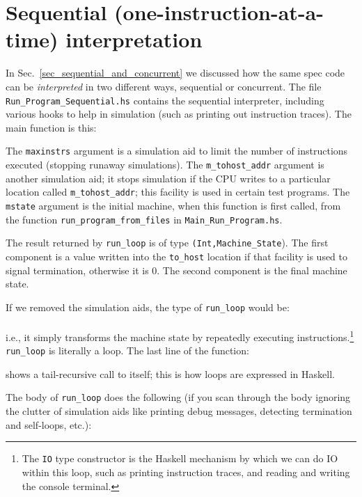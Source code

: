 \documentclass[11pt]{article}
\newcommand{\hmmm}{\hspace*{3em}}
\begin{document}

\section{Sequential (one-instruction-at-a-time)  interpretation}

In Sec.~\ref{sec_sequential_and_concurrent} we discussed how the same
spec code can be \emph{interpreted} in two different ways, sequential
or concurrent.  The file \verb|Run_Program_Sequential.hs| contains the
sequential interpreter, including various hooks to help in simulation
(such as printing out instruction traces).  The main function is this:



The \verb|maxinstrs| argument is a simulation aid to limit the number
of instructions executed (stopping runaway simulations).  The
\verb|m_tohost_addr| argument is another simulation aid; it stops
simulation if the CPU writes to a particular location called
\verb|m_tohost_addr|; this facility is used in certain test programs.
The \verb|mstate| argument is the initial machine, when this function
is first called, from the function \verb|run_program_from_files| in
\verb|Main_Run_Program.hs|.

The result returned by \verb|run_loop| is of type
\verb|(Int,Machine_State|).  The first component is a value written
into the \verb|to_host| location if that facility is used to signal
termination, otherwise it is 0.  The second component is the final
machine state.

If we removed the simulation aids, the type of \verb|run_loop| would
be: \\
\hmmm {\tt Machine\_State -> IO Machine\_State} \\
i.e., it simply transforms the machine state by repeatedly executing
instructions.\footnote{ The {\tt IO} type constructor is the Haskell
mechanism by which we can do IO within this loop, such as printing
instruction traces, and reading and writing the console terminal.}
\verb|run_loop| is literally a loop.  The last line of the function:



shows a tail-recursive call to itself; this is how loops are expressed in Haskell.

The body of \verb|run_loop| does the following (if you scan through
the body ignoring the clutter of simulation aids like printing debug
messages, detecting termination and self-loops, etc.):
\end{document}
